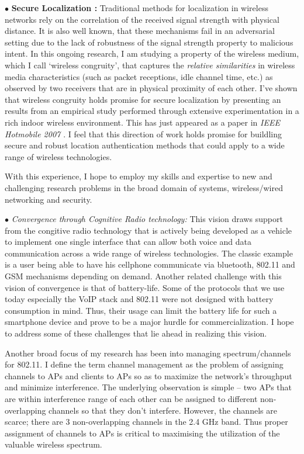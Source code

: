 \documentclass[11pt,letterpaper]{article}
\begin{document}
$\bullet$ {\bf Secure Localization :} Traditional methods for localization in wireless networks rely on the correlation of the received signal strength with
physical distance. It is also well known, that these mechanisms fail in an adversarial setting due to the lack of
robustness of the signal strength property to malicious intent. In this ongoing research, I am studying a property of the wireless
medium, which I call `wireless congruity', that captures the {\it relative similarities} in wireless media
characteristics (such as packet receptions, idle channel time, etc.) as observed by two receivers that are in physical
proximity of each other. I've shown that wireless congruity holds promise for secure localization by presenting an
results from an empirical study performed through extensive experimentation in a rich indoor wireless environment.
This has just appeared as a paper in {\it IEEE Hotmobile 2007 \cite{cong2007}}. I feel that this direction of work holds promise for
buildling secure and robust location authentication methods that could apply to a wide range of wireless technologies.

With this experience, I hope to employ my skills and expertise to new and challenging research problems in the broad
domain of systems, wireless/wired networking and security.

\iffalse
$\bullet$ {\it Convergence through Cognitive Radio technology:} This vision draws support from the congitive radio
technology that is actively being developed as a vehicle to implement one single interface that can allow both voice and
data communication across a wide range of wireless technologies. The classic example is a user being able to have his
cellphone communicate via bluetooth, 802.11 and GSM mechanisms depending on demand. Another related challenge with this
vision of convergence is that of battery-life. Some of the protocols that we use today especially the VoIP stack and
802.11 were not designed with battery consumption in mind. Thus, their usage can limit the battery life for such a
smartphone device and prove to be a major hurdle for commercialization. I hope to address some of these challenges that lie
ahead in realizing this vision.

Another broad focus of my research  has been into managing spectrum/channels for 802.11. I define the term channel management
as the problem of assigning channels to APs and clients to APs so as to maximize the network's throughput and minimize
interference. The underlying observation is simple -- two APs that are within interference range of each other can be
assigned to different non-overlapping channels so that they don't interfere. However, the channels are scarce; there are
3 non-overlapping channels in the 2.4 GHz band. Thus proper assignment of channels to APs is critical to maximising the
utilization of the valuable wireless spectrum. 
\end{document}
